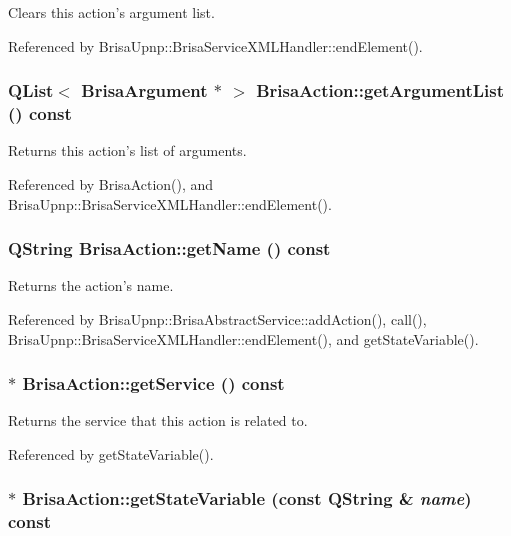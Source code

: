 Clears this action's argument list. 

Referenced by BrisaUpnp::BrisaServiceXMLHandler::endElement().\hypertarget{classBrisaUpnp_1_1BrisaAction_a2879477a3ade3b8529266cbf602b16b5}{
\subsubsection[{getArgumentList}]{\setlength{\rightskip}{0pt plus 5cm}QList$<$ {\bf BrisaArgument} $\ast$ $>$ BrisaAction::getArgumentList () const}}
\label{classBrisaUpnp_1_1BrisaAction_a2879477a3ade3b8529266cbf602b16b5}


Returns this action's list of arguments. 

Referenced by BrisaAction(), and BrisaUpnp::BrisaServiceXMLHandler::endElement().\hypertarget{classBrisaUpnp_1_1BrisaAction_a409d834cfb64c57e4639d729a0885483}{
\subsubsection[{getName}]{\setlength{\rightskip}{0pt plus 5cm}QString BrisaAction::getName () const}}
\label{classBrisaUpnp_1_1BrisaAction_a409d834cfb64c57e4639d729a0885483}


Returns the action's name. 

Referenced by BrisaUpnp::BrisaAbstractService::addAction(), call(), BrisaUpnp::BrisaServiceXMLHandler::endElement(), and getStateVariable().\hypertarget{classBrisaUpnp_1_1BrisaAction_a64e61dbdbffaa72111277c54b4b0aa65}{
\subsubsection[{getService}]{ $\ast$ BrisaAction::getService () const}}
\label{classBrisaUpnp_1_1BrisaAction_a64e61dbdbffaa72111277c54b4b0aa65}


Returns the service that this action is related to. 

Referenced by getStateVariable().\hypertarget{classBrisaUpnp_1_1BrisaAction_a23fd74faf42b1008a6d924a3b3007797}{
\subsubsection[{getStateVariable}]{ $\ast$ BrisaAction::getStateVariable (const QString \& {\em name}) const}}
\label{classBrisaUpnp_1_1BrisaAction_a23fd74faf42b1008a6d924a3b3007797}


